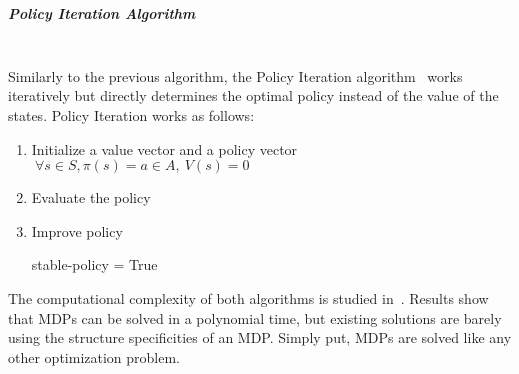 \textbf{\\}
\subparagraph{Policy Iteration Algorithm}\textbf{\\}
Similarly to the previous algorithm, the Policy Iteration algorithm~\cite{policyiteration} works iteratively but directly determines the optimal policy instead of the value of the states.
Policy Iteration works as follows:
\begin{enumerate}
    \item Initialize a value vector and a policy vector $~\forall s\in S,\pi(s)=a\in A,~V(s)=0$
    \item Evaluate the policy
        \begin{algorithm}
        \end{algorithm}\newpage
    \item Improve policy
    \begin{algorithm}
        stable-policy = True
    \end{algorithm}
\end{enumerate}



The computational complexity of both algorithms is studied in~\cite{mdpcomplexity}.
Results show that MDPs can be solved in a polynomial time, but existing solutions are barely using the structure specificities of an MDP. Simply put, MDPs are solved like any other optimization problem.

